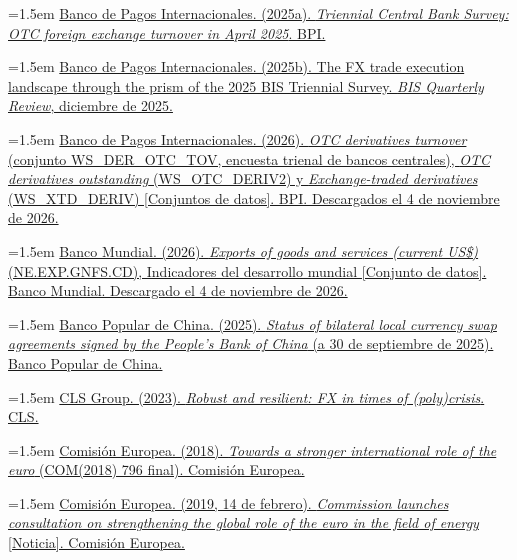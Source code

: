 \documentclass[10pt,a4paper]{article}
\begin{document}
\noindent\hangindent=1.5em \href{https://www.bis.org/statistics/rpfx25_fx.htm}{Banco de Pagos Internacionales. (2025a). \textit{Triennial Central Bank Survey: OTC foreign exchange turnover in April 2025}. BPI.}

\noindent\hangindent=1.5em \href{https://www.bis.org/publ/qtrpdf/r_qt2512v.htm}{Banco de Pagos Internacionales. (2025b). The FX trade execution landscape through the prism of the 2025 BIS Triennial Survey. \textit{BIS Quarterly Review}, diciembre de 2025.}

{\sloppy\noindent\hangindent=1.5em \href{https://data.bis.org/bulkdownload}{Banco de Pagos Internacionales. (2026). \textit{OTC derivatives turnover} (conjunto WS\_DER\_OTC\_TOV, encuesta trienal de bancos centrales), \textit{OTC derivatives outstanding} (WS\_OTC\_DERIV2) y \textit{Exchange-traded derivatives} (WS\_XTD\_DERIV) [Conjuntos de datos]. BPI. Descargados el 4 de noviembre de 2026.}\par}

\noindent\hangindent=1.5em \href{https://data.worldbank.org/indicator/NE.EXP.GNFS.CD}{Banco Mundial. (2026). \textit{Exports of goods and services (current US\$)} (NE.EXP.GNFS.CD), Indicadores del desarrollo mundial [Conjunto de datos]. Banco Mundial. Descargado el 4 de noviembre de 2026.}

\noindent\hangindent=1.5em \href{https://camlmac.pbc.gov.cn/en/3688241/3688636/3688657/5920618/index.html}{Banco Popular de China. (2025). \textit{Status of bilateral local currency swap agreements signed by the People's Bank of China} (a 30 de septiembre de 2025). Banco Popular de China.}

\noindent\hangindent=1.5em \href{https://www.cls-group.com/media/aiohqf4e/whitepaper_04_the-fx_ecosystem_fx_in_times_of_crisis_nov2023.pdf}{CLS Group. (2023). \textit{Robust and resilient: FX in times of (poly)crisis}. CLS.}

\noindent\hangindent=1.5em \href{https://eur-lex.europa.eu/legal-content/EN/TXT/?uri=COM:2018:796:FIN}{Comisión Europea. (2018). \textit{Towards a stronger international role of the euro} (COM(2018) 796 final). Comisión Europea.}

\noindent\hangindent=1.5em \href{https://commission.europa.eu/news-and-media/news/commission-launches-consultation-strengthening-global-role-euro-field-energy-2019-02-14_en}{Comisión Europea. (2019, 14 de febrero). \textit{Commission launches consultation on strengthening the global role of the euro in the field of energy} [Noticia]. Comisión Europea.}
\end{document}
